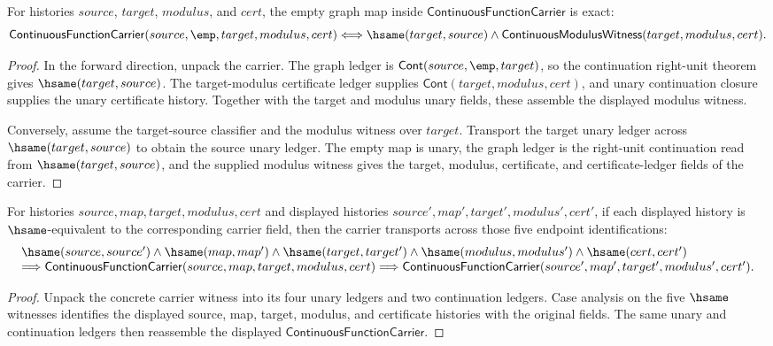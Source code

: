 \begin{theorem}
\label{thm:continuous-function-carrier-empty-map-iff}
For histories $source$, $target$, $modulus$, and $cert$, the empty graph map
inside $\mathsf{ContinuousFunctionCarrier}$ is exact:
$$
\mathsf{ContinuousFunctionCarrier}(source,\emp,target,modulus,cert)
\Longleftrightarrow
\hsame(target,source)\land
\mathsf{ContinuousModulusWitness}(target,modulus,cert).
$$
\end{theorem}
\begin{proof}
In the forward direction, unpack the carrier. The graph ledger is
$\mathsf{Cont}(source,\emp,target)$, so the continuation right-unit theorem gives
$\hsame(target,source)$. The target-modulus certificate ledger supplies
$\mathsf{Cont}(target,modulus,cert)$, and unary continuation closure supplies
the unary certificate history. Together with the target and modulus unary
fields, these assemble the displayed modulus witness.

Conversely, assume the target-source classifier and the modulus witness over
$target$. Transport the target unary ledger across $\hsame(target,source)$ to
obtain the source unary ledger. The empty map is unary, the graph ledger is the
right-unit continuation read from $\hsame(target,source)$, and the supplied
modulus witness gives the target, modulus, certificate, and certificate-ledger
fields of the carrier.
\end{proof}

\begin{theorem}
\label{thm:continuous-function-carrier-hsame-transport}
For histories $source,map,target,modulus,cert$ and displayed histories
$source',map',target',modulus',cert'$, if each displayed history is
$\hsame$-equivalent to the corresponding carrier field, then the carrier
transports across those five endpoint identifications:
$$
\begin{array}{l}
\hsame(source,source')\land\hsame(map,map')\land
\hsame(target,target')\land\hsame(modulus,modulus')\land
\hsame(cert,cert')
\\
\Longrightarrow
\mathsf{ContinuousFunctionCarrier}(source,map,target,modulus,cert)
\Longrightarrow
\mathsf{ContinuousFunctionCarrier}(source',map',target',modulus',cert').
\end{array}
$$
\end{theorem}
\begin{proof}
Unpack the concrete carrier witness into its four unary ledgers and two
continuation ledgers. Case analysis on the five $\hsame$ witnesses identifies
the displayed source, map, target, modulus, and certificate histories with the
original fields. The same unary and continuation ledgers then reassemble the
displayed $\mathsf{ContinuousFunctionCarrier}$.
\end{proof}

